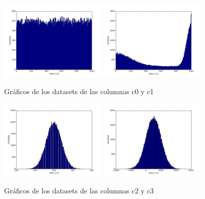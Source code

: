 \begin{figure}[h!]
  \centering
  \includegraphics[width=0.45\textwidth]{./../source/datasets/img/c0}
  \includegraphics[width=0.45\textwidth]{./../source/datasets/img/c1}
  \caption{Gráficos de los datasets de las columnas c0 y c1}
 \end{figure}
 
 
\begin{figure}[h!]
  \centering
  \includegraphics[width=0.45\textwidth]{./../source/datasets/img/c2}
  \includegraphics[width=0.45\textwidth]{./../source/datasets/img/c3}
  \caption{Gráficos de los datasets de las columnas c2 y c3}
 \end{figure}
 
